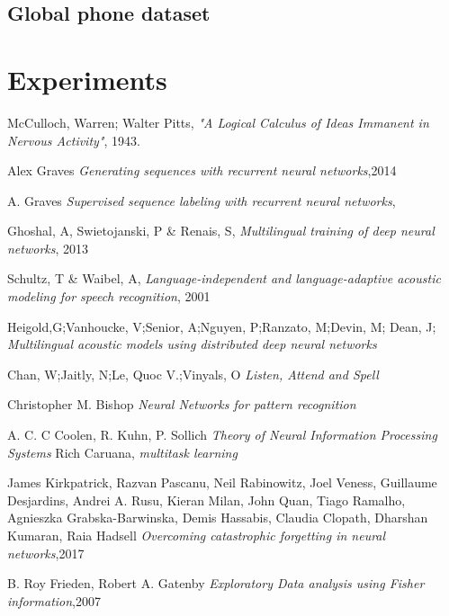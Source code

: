\documentclass[a4paper]{article}
\begin{document}
\subsection{Global phone dataset}
\section{Experiments}




\begin{thebibliography}{9}
  McCulloch, Warren; Walter Pitts,
  \emph{"A Logical Calculus of Ideas Immanent in Nervous Activity"},
  1943.
  
  Alex Graves \emph{Generating sequences with recurrent neural networks},2014

 A. Graves \emph{Supervised sequence labeling with recurrent neural networks},
  
  Ghoshal, A, Swietojanski, P \& Renais, S, \emph{Multilingual training of deep neural networks}, 2013
  
  Schultz, T \& Waibel, A, \emph{Language-independent and language-adaptive acoustic modeling for speech recognition}, 2001

 Heigold,G;Vanhoucke, V;Senior, A;Nguyen, P;Ranzato, M;Devin, M; Dean, J; \emph{Multilingual acoustic models using distributed deep neural networks}

 Chan, W;Jaitly, N;Le, Quoc V.;Vinyals, O \emph{Listen, Attend and Spell}
 
 Christopher M. Bishop \emph{Neural Networks for pattern recognition}
 
A. C. C Coolen, R. Kuhn, P. Sollich \emph{Theory of Neural Information Processing Systems}
 Rich Caruana, \emph{multitask learning}

James Kirkpatrick, Razvan Pascanu, Neil Rabinowitz, Joel Veness, Guillaume Desjardins, Andrei A. Rusu, Kieran Milan, John Quan, Tiago Ramalho, Agnieszka Grabska-Barwinska, Demis Hassabis, Claudia Clopath, Dharshan Kumaran, Raia Hadsell \emph{Overcoming catastrophic forgetting in neural networks},2017

B. Roy Frieden, Robert A. Gatenby \emph{Exploratory Data analysis using Fisher information},2007
 

 
 
\end{thebibliography}
\end{document}

